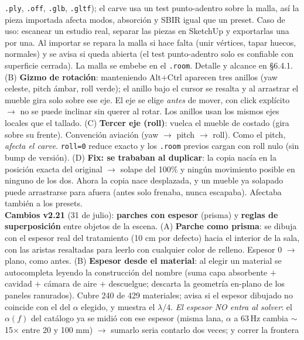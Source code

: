 \documentclass[11pt, a4paper]{article}
\begin{document}
\begin{center}
{    \texttt{.ply}, \texttt{.off}, \texttt{.glb}, \texttt{.gltf}); el carve usa un test
    punto-adentro sobre la malla, así la pieza importada afecta modos, absorción y
    SBIR igual que un preset. Caso de uso: escanear un estudio real, separar las
    piezas en SketchUp y exportarlas una por una. Al importar se repara la malla si
    hace falta (unir vértices, tapar huecos, normales) y se avisa si queda abierta
    (el test punto-adentro solo es confiable con superficie cerrada). La malla se
    embebe en el \texttt{.room}. Detalle y alcance en \S6.4.1.
    (B) \textbf{Gizmo de rotación}: manteniendo Alt$+$Ctrl aparecen tres anillos
    (yaw celeste, pitch ámbar, roll verde); el anillo bajo el cursor se resalta y
    al arrastrar el mueble gira solo sobre ese eje. El eje se elige \emph{antes} de
    mover, con click explícito $\to$ no se puede inclinar sin querer al rotar. Los
    anillos usan los mismos ejes locales que el tallado.
    (C) \textbf{Tercer eje (roll)}: vuelca el mueble de costado (gira sobre su
    frente). Convención aviación (yaw $\to$ pitch $\to$ roll). Como el pitch,
    \emph{afecta el carve}. \texttt{roll=0} reduce exacto y los \texttt{.room}
    previos cargan con roll nulo (sin bump de versión).
    (D) \textbf{Fix: se trababan al duplicar}: la copia nacía en la posición exacta
    del original $\to$ solape del 100\% y ningún movimiento posible en ninguno de
    los dos. Ahora la copia nace desplazada, y un mueble ya solapado puede
    arrastrarse para afuera (antes solo frenaba, nunca escapaba). Afectaba también
    a los presets.\\[2pt]
    \textbf{Cambios v2.21} (31 de julio): \textbf{parches con espesor} (prisma) y
    \textbf{reglas de superposición} entre objetos de la escena.
    (A) \textbf{Parche como prisma}: se dibuja con el espesor real del tratamiento
    (10 cm por defecto) hacia el interior de la sala, con las aristas resaltadas
    para leerlo con cualquier color de relleno. Espesor 0 $\to$ plano, como antes.
    (B) \textbf{Espesor desde el material}: al elegir un material se autocompleta
    leyendo la construcción del nombre (suma capa absorbente $+$ cavidad $+$
    cámara de aire $+$ descuelgue; descarta la geometría en-plano de los paneles
    ranurados). Cubre 240 de 429 materiales; avisa si el espesor dibujado no
    coincide con el del $\alpha$ elegido, y muestra el $\lambda/4$.
    \emph{El espesor NO entra al solver}: el $\alpha(f)$ del catálogo ya se midió
    con ese espesor (misma lana, $\alpha$ a 63\,Hz cambia $\sim$15$\times$ entre
    20 y 100 mm) $\to$ sumarlo seria contarlo dos veces; y correr la frontera
}
\end{center}
\end{document}
